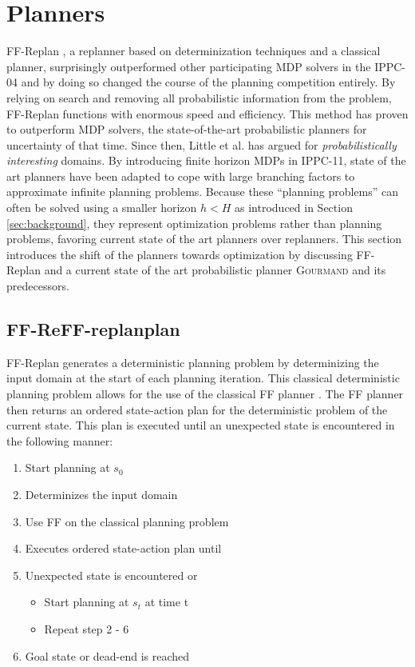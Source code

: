 \documentclass[runningheads,a4paper]{llncs}
\begin{document}

\section{Planners}
\label{sec:planners}

FF-Replan \cite{FFReplan}, a replanner based on determinization techniques and a classical planner, surprisingly outperformed other participating MDP solvers in the IPPC-04 and by doing so changed the course of the planning competition entirely. By relying on search and removing all probabilistic information from the problem, FF-Replan functions with enormous speed and efficiency. This method has proven to outperform MDP solvers, the state-of-the-art probabilistic planners for uncertainty of that time. Since then, Little et al. has argued for \emph{probabilistically interesting} domains. By introducing finite horizon MDPs in IPPC-11, state of the art planners have been adapted to cope with large branching factors to approximate infinite planning problems. Because these ``planning problems'' can often be solved using a smaller horizon $h < H$ as introduced in Section \ref{sec:background}, they represent optimization problems rather than planning problems, favoring current state of the art planners over replanners. This section introduces the shift of the planners towards optimization  by discussing FF-Replan and a current state of the art probabilistic planner \textsc{Gourmand} and its predecessors.

\subsection{FF-ReFF-replanplan}
\label{sec:ffreplan}
 FF-Replan generates a deterministic planning problem by determinizing the input domain at the start of each planning iteration. This classical deterministic planning problem allows for the use of the classical FF planner \cite{Hoffmann01theff}. The FF planner then returns an ordered state-action plan for the deterministic problem of the current state. This plan is executed until an unexpected state is encountered in the following manner:

\begin{enumerate}
	\item Start planning at $s_0$
	\item Determinizes the input domain
	\item Use FF on the classical planning problem
	\item Executes ordered state-action plan until
	\item Unexpected state is encountered or
	\begin{itemize}
		\item Start planning at $s_t$ at time t
		\item Repeat step 2 - 6
	\end{itemize}
	\item Goal state or dead-end is reached
\end{enumerate}
\end{document}

